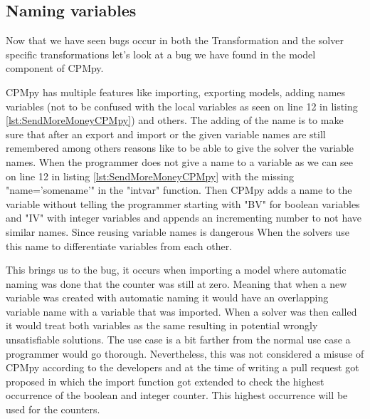 %
%

\subsection{Naming variables}
\label{res:bug:Naming+andImport}
Now that we have seen bugs occur in both the Transformation and the solver specific transformations let's look at a bug we have found in the model component of CPMpy. 

CPMpy has multiple features like importing, exporting models, adding names variables (not to be confused with the local variables as seen on line 12 in listing \ref{lst:SendMoreMoneyCPMpy}) and others. The adding of the name is to make sure that after an export and import or the given variable names are still remembered among others reasons like to be able to give the solver the variable names. When the programmer does not give a name to a variable as we can see on line 12 in listing \ref{lst:SendMoreMoneyCPMpy} with the missing "name='somename'" in the "intvar" function. Then CPMpy adds a name to the variable without telling the programmer starting with "BV" for boolean variables and "IV" with integer variables and appends an incrementing number to not have similar names. Since reusing variable names is dangerous When the solvers use this name to differentiate variables from each other.

This brings us to the bug, it occurs when importing a model where automatic naming was done that the counter was still at zero. Meaning that when a new variable was created with automatic naming it would have an overlapping variable name with a variable that was imported. When a solver was then called it would treat both variables as the same resulting in potential wrongly unsatisfiable solutions. The use case is a bit farther from the normal use case a programmer would go thorough. Nevertheless, this was not considered a misuse of CPMpy according to the developers and at the time of writing a pull request got proposed in which the import function got extended to check the highest occurrence of the boolean and integer counter. This highest occurrence will be used for the counters.

